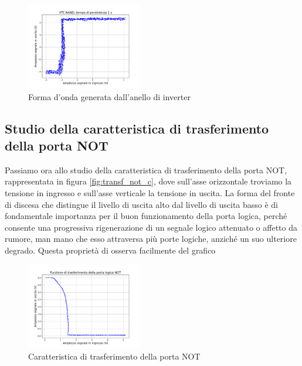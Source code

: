 \documentclass[journal]{IEEEtran}
\begin{document}
\begin{figure}[H]%
\begin{center}
\includegraphics[width=0.45\textwidth]{analysis/output/NAND-XY.pdf}
\caption{Forma d'onda generata dall'anello di inverter}
\label{fig:graph_ring_oscillator}
\end{center}
\end{figure}


\subsection{Studio della caratteristica di trasferimento della porta NOT}
Passiamo ora allo studio della caratteristica di trasferimento della porta NOT, rappresentata in figura \ref{fig:transf_not_c}, dove sull'asse orizzontale troviamo la tensione in ingresso e sull'asse verticale la tensione in uscita. La forma del fronte di discesa che distingue il livello di uscita alto dal livello di uscita basso è di fondamentale importanza per il buon funzionamento della porta logica, perché consente una progressiva rigenerazione di un segnale logico attenuato o affetto da rumore, man mano che esso attraversa più porte logiche, anziché un suo ulteriore degrado. Questa proprietà di osserva facilmente del grafico

\begin{figure}[H]%
\begin{center}
\includegraphics[width=0.45\textwidth]{analysis/output/inverter_ring_xy.pdf}
\caption{Caratteristica di trasferimento della porta NOT}
\label{fig:transf_not}
\end{center}
\end{figure}
\end{document}
